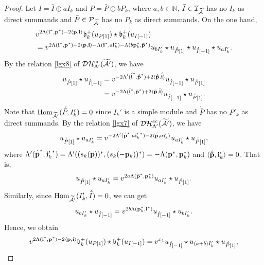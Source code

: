 \documentclass[reqno,12pt]{amsart}
\numberwithin{equation}{section}
\theoremstyle{plain} %
\theoremstyle{definition} %
\begin{document}
\begin{proof}
	
 Let $I=\bar{I}\oplus aI_k$ and $P=\bar{P}\oplus bP_k$, where $a,b\in \mathbb{N}$, $\bar{I}\in\mathcal{I}_{\widetilde{\mathcal{A}}}$ has no $I_k$ as direct summands and $\bar{P}\in\mathcal{P}_{\widetilde{\mathcal{A}}}$ has no $P_k$ as direct summands.
On the one hand,
	 \begin{equation*}
\begin{split}
	 	&v^{2\Lambda({\bf i}^\ast, {\bf p}^\ast)-2\langle {\bf p}, {\bf i}\rangle}\mathfrak{b}_k^+(u_{P[1]})\star \mathfrak{b}_k^+(u_{I[-1]}) \\
	 	&=v^{2\Lambda({\bf i}^\ast, {\bf p}^\ast)-2\langle {\bf p}, {\bf i}\rangle-\Lambda(\bar{\bf i}^\ast, a{\bf i}_k^\ast)-\Lambda(b{\bf p}_k^\ast,{\bar{\bf p}}^\ast)}u_{bI_k'}\star u_{\acute{\bar{P}}[1]}\star u_{\acute{\bar{I}}[-1]}\star u_{aI_k'}.
	 \end{split}\end{equation*}
By the relation \eqref{lgx8} of $\mathcal{DH}_{\Lambda'}^{ec}(\widetilde{\mathcal{A}'})$, we have
\begin{align*}u_{\acute{\bar{P}}[1]}\star u_{\acute{\bar{I}}[-1]}&=v^{-2\Lambda'({\acute{\bar{\bf i}}}^\ast, {\acute{\bar{\bf p}}}^\ast)+2\langle \acute{\bar{{\bf p}}},\acute{\bar{\bf i}}\rangle}u_{\acute{\bar{I}}[-1]}\star u_{\acute{\bar{P}}[1]}\\
&=v^{-2\Lambda({\bar{\bf i}}^\ast, {\bar{\bf p}}^\ast)+2\langle \bar{{\bf p}},\bar{\bf i}\rangle}u_{\acute{\bar{I}}[-1]}\star u_{\acute{\bar{P}}[1]}.\end{align*}
	 Note that $\mbox{\rm Hom}_{\widetilde{\mathcal{A}'}}(\acute{\bar{P}}, I_k')=0$ since $I_k'$ is a simple module and $\acute{\bar{P}}$ has no $P'_k$ as direct summands. By the relation \eqref{lgx7} of $\mathcal{DH}_{\Lambda'}^{ec}(\widetilde{\mathcal{A}'})$, we have
	 \[u_{\acute{\bar{P}}[1]}\star u_{aI_k'}=v^{-2\Lambda'({\acute{\bar{\bf p}}}^\ast, a{{\bf i}_k'}^\ast)-2\langle {\acute{\bar{\bf p}}},a{\bf i}_k'\rangle}u_{aI_k'}\star u_{\acute{\bar{P}}[1]},\]
where $\Lambda'({\acute{\bar{\bf p}}}^\ast, {{\bf i}_k'}^\ast)=\Lambda'((s_k(\bar{\bf p}))^\ast,(s_k(-{\bf p}_k))^\ast)=-\Lambda({\bar{\bf p}}^\ast,{\bf p}_k^\ast)$ and $\langle {\acute{\bar{\bf p}}},{\bf i}_k'\rangle=0$.
That is, \[u_{\acute{\bar{P}}[1]}\star u_{aI_k'}=v^{2a\Lambda({\bar{\bf p}}^\ast,{\bf p}_k^\ast)}u_{aI_k'}\star u_{\acute{\bar{P}}[1]}.\]
Similarly, since $\mbox{\rm Hom}_{\widetilde{\mathcal{A}'}}(I'_k,\acute{\bar{I}})=0$, we can get
\[u_{bI_k'}\star u_{\acute{\bar{I}}[-1]}=v^{2b\Lambda({\bf p}_k^\ast,{\bar{\bf i}}^\ast)}u_{\acute{\bar{I}}[-1]}\star u_{bI_k'}.\]
Hence, we obtain
\begin{align*}v^{2\Lambda({\bf i}^\ast, {\bf p}^\ast)-2\langle {\bf p}, {\bf i}\rangle}\mathfrak{b}_k^+(u_{P[1]})\star \mathfrak{b}_k^+(u_{I[-1]})=v^{x_1}u_{\acute{\bar{I}}[-1]}\star u_{(a+b)I_k'}\star u_{\acute{\bar{P}}[1]},\end{align*}

\end{proof}
\end{document}
